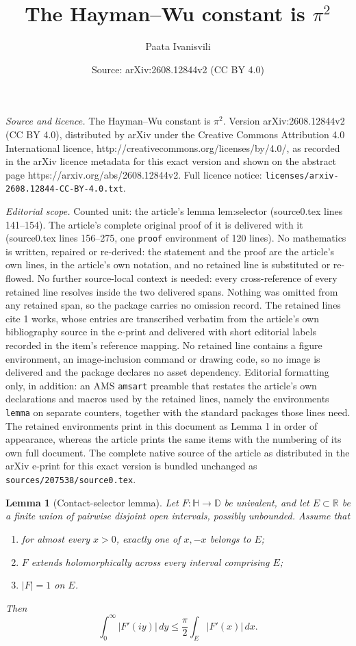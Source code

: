 \documentclass[10pt,a4paper]{amsart}
\title{The Hayman--Wu constant is $\pi^2$}
\author{Paata Ivanisvili}
\date{Source: arXiv:2608.12844v2 (CC BY 4.0)}
\newtheorem{lemma}{Lemma}
\newcommand{\D}{\mathbb D}
\newcommand{\Hh}{\mathbb H}
\newcommand{\R}{\mathbb R}
\begin{document}
\maketitle

\noindent\emph{Source and licence.} The Hayman--Wu constant is $\pi^2$. Version arXiv:2608.12844v2 (CC BY 4.0), distributed by arXiv under the Creative Commons Attribution 4.0 International licence, http://creativecommons.org/licenses/by/4.0/, as recorded in the arXiv licence metadata for this exact version and shown on the abstract page https://arxiv.org/abs/2608.12844v2. Full licence notice: \texttt{licenses/arxiv-2608.12844-CC-BY-4.0.txt}.\par\smallskip

\noindent\textit{Editorial scope.} Counted unit: the article's lemma lem:selector (source0.tex lines 141--154). The article's complete original proof of it is delivered with it (source0.tex lines 156--275, one \texttt{proof} environment of 120 lines). No mathematics is written, repaired or re-derived: the statement and the proof are the article's own lines, in the article's own notation, and no retained line is substituted or re-flowed.  No further source-local context is needed: every cross-reference of every retained line resolves inside the two delivered spans.  Nothing was omitted from any retained span, so the package carries no omission record.  The retained lines cite 1 works, whose entries are transcribed verbatim from the article's own bibliography source in the e-print and delivered with short editorial labels recorded in the item's reference mapping.  No retained line contains a figure environment, an image-inclusion command or drawing code, so no image is delivered and the package declares no asset dependency.  Editorial formatting only, in addition: an AMS \texttt{amsart} preamble that restates the article's own declarations and macros used by the retained lines, namely the environments \texttt{lemma} on separate counters, together with the standard packages those lines need.  The retained environments print in this document as Lemma 1 in order of appearance, whereas the article prints the same items with the numbering of its own full document.  The complete native source of the article as distributed in the arXiv e-print for this exact version is bundled unchanged as \texttt{sources/207538/source0.tex}.
\begin{lemma}[Contact-selector lemma]\label{lem:selector}
Let $F:\Hh\to\D$ be univalent, and let $E\subset\R$ be a finite union of
pairwise disjoint open intervals, possibly unbounded. Assume that
\begin{enumerate}[label=\textup{(\roman*)},leftmargin=2.4em]
\item for almost every $x>0$, exactly one of $x,-x$ belongs to $E$;
\item $F$ extends holomorphically across every interval comprising $E$;
\item $|F|=1$ on $E$.
\end{enumerate}
Then
\begin{equation}\label{eq:selector-main}
  \int_0^\infty |F'(iy)|\,dy
  \le \frac\pi2\int_E|F'(x)|\,dx.
\end{equation}
\end{lemma}
\end{document}
